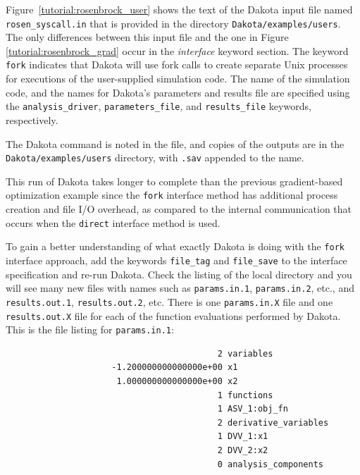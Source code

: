 Figure~\ref{tutorial:rosenbrock_user} shows the text of the Dakota
input file named \texttt{rosen\_syscall.in} that is
provided in the directory \texttt{Dakota/examples/users}.
The only differences between this input file and the one in Figure~
\ref{tutorial:rosenbrock_grad} occur in the \emph{interface} keyword
section. The keyword \texttt{fork} indicates that Dakota will use
fork calls to create separate Unix processes for executions of the
user-supplied simulation code. The name of the simulation code, and
the names for Dakota's parameters and results file are specified using
the \texttt{analysis\_driver}, \texttt{parameters\_file}, and
\texttt{results\_file} keywords, respectively.

The Dakota command is noted in the file, and copies of the outputs
are in the \texttt{Dakota/examples/users} directory, with \texttt{.sav} 
appended to the name.  

This run of Dakota takes longer to complete than the previous
gradient-based optimization example since the \texttt{fork}
interface method has additional process creation and file I/O
overhead, as compared to the internal communication that occurs when
the \texttt{direct} interface method is used. 

To gain a better understanding of what exactly Dakota is doing with
the \texttt{fork} interface approach, add the keywords
\texttt{file\_tag} and \texttt{file\_save} to the interface
specification and re-run Dakota. Check the listing of the local
directory and you will see many new files with names such as
\texttt{params.in.1}, \texttt{params.in.2}, etc., and
\texttt{results.out.1}, \texttt{results.out.2}, etc. There is one
\texttt{params.in.X} file and one \texttt{results.out.X} file for each
of the function evaluations performed by Dakota. This is the file
listing for \texttt{params.in.1}:
\begin{small}
\begin{verbatim}
                                          2 variables
                     -1.200000000000000e+00 x1
                      1.000000000000000e+00 x2
                                          1 functions
                                          1 ASV_1:obj_fn
                                          2 derivative_variables
                                          1 DVV_1:x1
                                          2 DVV_2:x2
                                          0 analysis_components
\end{verbatim}
\end{small}

